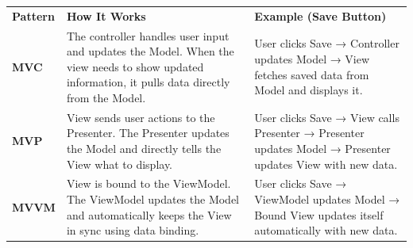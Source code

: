 \begin{center}
{\def\LTcaptype{none} %
\begin{longtable}[]{@{}
>{\centering\arraybackslash} p{}
>{\centering\arraybackslash} p{}
>{\centering\arraybackslash} p{}@{}}
\toprule\noalign{}
\endhead
\bottomrule\noalign{}
\endlastfoot
\begin{minipage}[t]{\linewidth}\centering
\textbf{Pattern}
\end{minipage} & \begin{minipage}[t]{\linewidth}\centering
\textbf{How It Works}
\end{minipage} & \begin{minipage}[t]{\linewidth}\centering
\textbf{Example (Save Button)}
\end{minipage} \\
\begin{minipage}[t]{\linewidth}\centering
\textbf{MVC}
\end{minipage} & \begin{minipage}[t]{\linewidth}\centering
The controller handles user input and updates the Model. When the view needs to show updated information, it pulls data directly from the Model.
\end{minipage} & \begin{minipage}[t]{\linewidth}\centering
User clicks Save → Controller updates Model → View fetches saved data from Model and displays it.
\end{minipage} \\
\begin{minipage}[t]{\linewidth}\centering
\textbf{MVP}
\end{minipage} & \begin{minipage}[t]{\linewidth}\centering
View sends user actions to the Presenter. The Presenter updates the Model and directly tells the View what to display.
\end{minipage} & \begin{minipage}[t]{\linewidth}\centering
User clicks Save → View calls Presenter → Presenter updates Model → Presenter updates View with new data.
\end{minipage} \\
\begin{minipage}[t]{\linewidth}\centering
\textbf{MVVM}
\end{minipage} & \begin{minipage}[t]{\linewidth}\centering
View is bound to the ViewModel. The ViewModel updates the Model and automatically keeps the View in sync using data binding.
\end{minipage} & \begin{minipage}[t]{\linewidth}\centering
User clicks Save → ViewModel updates Model → Bound View updates itself automatically with new data.
\end{minipage} \\
\end{longtable}
}
\end{center}

